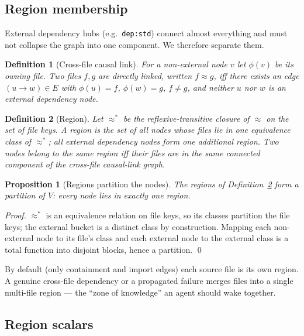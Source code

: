 \documentclass[11pt]{article}
\newtheorem{definition}{Definition}
\newtheorem{proposition}{Proposition}
\newcommand{\code}[1]{\texttt{#1}}
\begin{document}
\subsection{Region membership}

External dependency hubs (e.g.\ \code{dep:std}) connect almost everything and
must not collapse the graph into one component. We therefore separate them.

\begin{definition}[Cross-file causal link]
For a non-external node $v$ let $\phi(v)$ be its owning file. Two files $f,g$ are
\emph{directly linked}, written $f \approx g$, iff there exists an edge
$(u\!\to\!w)\in E$ with $\phi(u)=f$, $\phi(w)=g$, $f\neq g$, and neither $u$ nor
$w$ is an external dependency node.
\end{definition}

\begin{definition}[Region]\label{def:region}
Let $\approx^{*}$ be the reflexive-transitive closure of $\approx$ on the set of
file keys. A \emph{region} is the set of all nodes whose files lie in one
equivalence class of $\approx^{*}$; all external dependency nodes form one
additional region. Two nodes belong to the same region iff their files are in the
same connected component of the cross-file causal-link graph.
\end{definition}

\begin{proposition}[Regions partition the nodes]
The regions of Definition~\ref{def:region} form a partition of $V$: every node
lies in exactly one region.
\end{proposition}
\begin{proof}
$\approx^{*}$ is an equivalence relation on file keys, so its classes partition
the file keys; the external bucket is a distinct class by construction. Mapping
each non-external node to its file's class and each external node to the external
class is a total function into disjoint blocks, hence a partition. \qed
\end{proof}

By default (only containment and import edges) each source file is its own region.
A genuine cross-file dependency or a propagated failure merges files into a single
multi-file region --- the ``zone of knowledge'' an agent should wake together.

\subsection{Region scalars}
\end{document}
